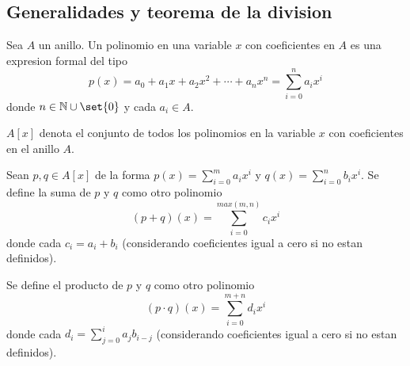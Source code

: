 \subsection{Generalidades y teorema de la division}
\begin{definition}[Polinomio]
	Sea \(A \) un anillo. Un polinomio en una variable \(x \) con coeficientes en \(A \) es una expresion formal del tipo
	\[
		p(x) = a_0 + a_1 x + a_2 x^{2} + \cdots + a_n x^{n} = \sum_{i=0}^{n} a_i x^{i}
	\]
	donde \(n \in \N \cup \set{0 }\) y cada \(a_i \in A \).
\end{definition}
\(A[x ]\) denota el conjunto de todos los polinomios en la variable \(x \) con coeficientes en el anillo \(A \).
\begin{definition}
	Sean \(p,q \in A[x ]\) de la forma \(p(x) = \sum_{i=0 }^{m } a_i x^{i } \) y \(q(x) = \sum_{i=0 }^{n } b_i x^{i } \). Se define la suma de \(p \) y \(q \) como otro polinomio
	\[
		(p + q)(x) = \sum_{i=0 }^{max(m,n)} c_i x^{i}
	\]
	donde cada \(c_i = a_i + b_i \) (considerando coeficientes igual a cero si no estan definidos).
	
	Se define el producto de \(p \) y \(q \) como otro polinomio
	\[
		(p \cdot q)(x) = \sum_{i=0 }^{m + n} d_i x^{i}
	\]
	donde cada \(d_i = \sum_{j=0 }^{i} a_j b_{i-j }\) (considerando coeficientes igual a cero si no estan definidos).
\end{definition}

